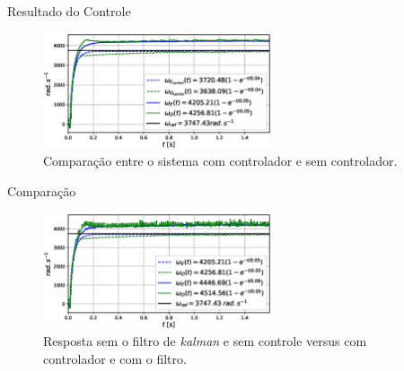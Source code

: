 \begin{frame}{Resultado do Controle}

    \begin{figure}
        \centering
        \includegraphics[width=0.6\textwidth]{figuras/resultados/exp02/controlador_vs_sem_controlador100.eps}
        \caption{Comparação entre o sistema com controlador e sem controlador.}
    \end{figure}
    
\end{frame}

\begin{frame}{Comparação}
    \begin{figure}
        \centering
        \includegraphics[width=0.6\textwidth]{figuras/resultados/exp02/antes_vs_depois100.eps}
        \caption{Resposta sem o filtro de \emph{kalman} e sem controle versus com controlador e com o filtro.}
    \end{figure}
\end{frame}